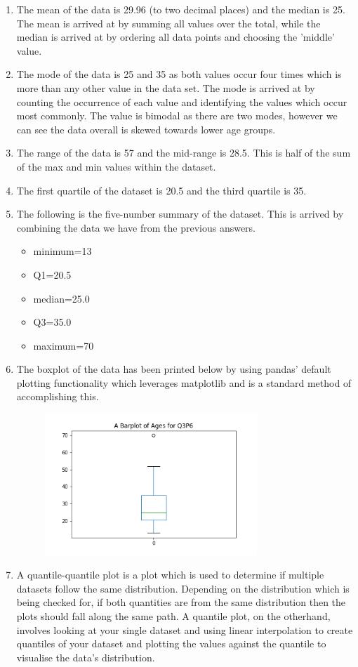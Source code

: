 \documentclass{scrreprt}
\begin{document}
\begin{enumerate}
	\item The mean of the data is 29.96 (to two decimal places) and the median is 25. The mean is arrived at by summing all values over the total, while the median is arrived at by ordering all data points and choosing the 'middle' value.
	\item The mode of the data is 25 and 35 as both values occur four times which is more than any other value in the data set. The mode is arrived at by counting the occurrence of each value and identifying the values which occur most commonly. The value is bimodal as there are two modes, however we can see the data overall is skewed towards lower age groups.
	\item The range of the data is 57 and the mid-range is 28.5. This is half of the sum of the max and min values within the dataset.
	\item The first quartile of the dataset is 20.5 and the third quartile is 35.
	\item The following is the five-number summary of the dataset. This is arrived by combining the data we have from the previous answers.
	\begin{itemize}
	\item minimum=13 
	\item Q1=20.5 
	\item median=25.0 
	\item Q3=35.0 
	\item maximum=70
	\end{itemize}
	\item The boxplot of the data has been printed below by using pandas' default plotting functionality which leverages matplotlib and is a standard method of accomplishing this.
\begin{figure}[h]
	\includegraphics[width=8cm]{Q3P6_Barplot}
	\centering
\end{figure}
	\item A quantile-quantile plot is a plot which is used to determine if multiple datasets follow the same distribution. Depending on the distribution which is being checked for, if both quantities are from the same distribution then the plots should fall along the same path. A quantile plot, on the otherhand, involves looking at your single dataset and using linear interpolation to create quantiles of your dataset and plotting the values against the quantile to visualise the data's distribution.
\end{enumerate}
\end{document}
